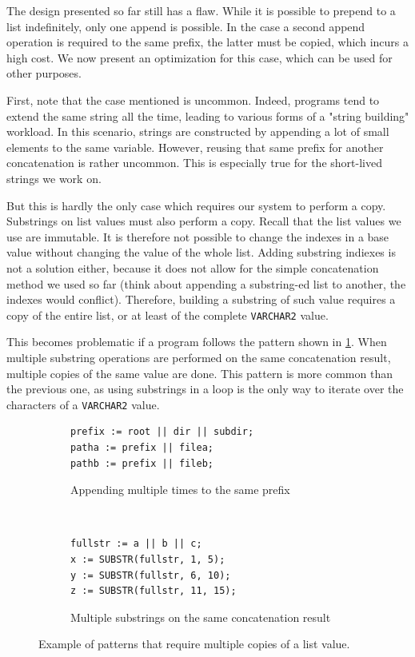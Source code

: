 \documentclass[twoside,11pt,a4paper]{article}
\newcommand{\pls}[1]{\small\texttt{#1}\normalsize}
\newcommand{\plstype}[1]{\pls{#1}}
\newcommand{\varchar}{\plstype{VARCHAR2}}
\begin{document}
The design presented so far still has a flaw. While it is possible to prepend to a list indefinitely, only one append is possible. In the case a second append operation is required to the same prefix, the latter must be copied, which incurs a high cost. We now present an optimization for this case, which can be used for other purposes.

First, note that the case mentioned is uncommon. Indeed, programs tend to extend the same string all the time, leading to various forms of a "string building" workload. In this scenario, strings are constructed by appending a lot of small elements to the same variable. However, reusing that same prefix for another concatenation is rather uncommon. This is especially true for the short-lived strings we work on.

But this is hardly the only case which requires our system to perform a copy. Substrings on list values must also perform a copy. Recall that the list values we use are immutable. It is therefore not possible to change the indexes in a base value without changing the value of the whole list. Adding substring indiexes is not a solution either, because it does not allow for the simple concatenation method we used so far (think about appending a substring-ed list to another, the indexes would conflict). Therefore, building a substring of such value requires a copy of the entire list, or at least of the complete \varchar{} value.


This becomes problematic if a program follows the pattern shown in \ref{fig:substrcanonpattern}. When multiple substring operations are performed on the same concatenation result, multiple copies of the same value are done. This pattern is more common than the previous one, as using substrings in a loop is the only way to iterate over the characters of a \varchar{} value.

\begin{figure}[tb]
	\begin{subfigure}[h]{\textwidth}
		\begin{lstlisting}[style=PLSQL, frame=L]
prefix := root || dir || subdir;
patha := prefix || filea;
pathb := prefix || fileb;
		\end{lstlisting}
		\caption{Appending multiple times to the same prefix}
	\end{subfigure}
	\,
	\begin{subfigure}[h]{\textwidth}
		\begin{lstlisting}[style=PLSQL, frame=L]
fullstr := a || b || c;
x := SUBSTR(fullstr, 1, 5);
y := SUBSTR(fullstr, 6, 10);
z := SUBSTR(fullstr, 11, 15);
		\end{lstlisting}
		\caption{Multiple substrings on the same concatenation result}
		\label{fig:substrcanonpattern}
	\end{subfigure}
	
	\caption{Example of patterns that require multiple copies of a list value.}
	\label{fig:canonpatterns}
\end{figure}
\end{document}
